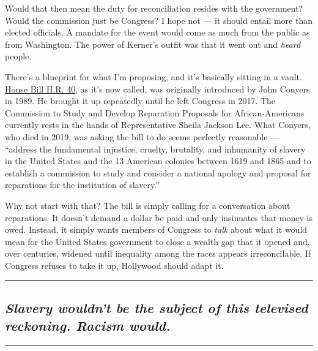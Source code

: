Would that then mean the duty for reconciliation resides with the
government? Would the commission just be Congress? I hope not --- it
should entail more than elected officials. A mandate for the event would
come as much from the public as from Washington. The power of Kerner's
outfit was that it went out and \emph{heard} people.

There's a blueprint for what I'm proposing, and it's basically sitting
in a vault.
\href{https://www.nytimes.com/2019/06/19/us/politics/slavery-reparations-hearing.html}{House
Bill H.R. 40}, as it's now called, was originally introduced by John
Conyers in 1989. He brought it up repeatedly until he left Congress in
2017. The Commission to Study and Develop Reparation Proposals for
African-Americans currently rests in the hands of Representative Sheila
Jackson Lee. What Conyers, who died in 2019, was asking the bill to do
seems perfectly reasonable --- ``address the fundamental injustice,
cruelty, brutality, and inhumanity of slavery in the United States and
the 13 American colonies between 1619 and 1865 and to establish a
commission to study and consider a national apology and proposal for
reparations for the institution of slavery.''

Why not start with that? The bill is simply calling for a conversation
about reparations. It doesn't demand a dollar be paid and only
insinuates that money is owed. Instead, it simply wants members of
Congress to \emph{talk} about what it would mean for the United States
government to close a wealth gap that it opened and, over centuries,
widened until inequality among the races appears irreconcilable. If
Congress refuses to take it up, Hollywood should adapt it.

\begin{center}\rule{0.5\linewidth}{\linethickness}\end{center}

\hypertarget{slavery-wouldnt-be-the-subject-of-this-televised-reckoning-racism-would}{%
\subsection{\texorpdfstring{\emph{Slavery wouldn't be the subject of
this televised reckoning. Racism
would.}}{Slavery wouldn't be the subject of this televised reckoning. Racism would.}}\label{slavery-wouldnt-be-the-subject-of-this-televised-reckoning-racism-would}}

\begin{center}\rule{0.5\linewidth}{\linethickness}\end{center}

